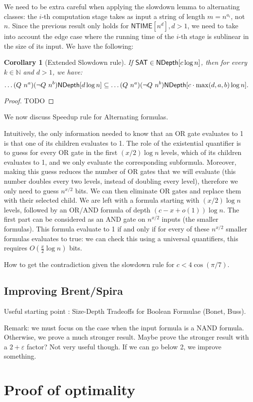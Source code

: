 \documentclass[a4paper, 11pt]{article}
\theoremstyle{plain}
\newtheorem{corollary}[theorem]{Corollary}
\theoremstyle{definition}
\theoremstyle{remark}
\newcommand{\NN}{\mathbb{N}}%
\newcommand{\eps}{\varepsilon}%
\newcommand{\NTIME}{\textsf{NTIME}}%
\newcommand{\SAT}{\textsf{SAT}}%
\newcommand{\NAND}{\textsf{NAND}}%
\newcommand{\ND}{\textsf{NDepth}}%
\newcommand{\NDL}[1]{\ensuremath\ND[ #1 \log n]}%
\begin{document}
We need to be extra careful when applying the slowdown lemma to alternating classes:
the $i$-th computation stage takes as input a string of length $m = n^{a_i}$, not $n$.
Since the previous result only holds for $\NTIME[n^d], d > 1$, 
we need to take into
account the edge case where the running time of the $i$-th
stage is sublinear in the size of its input.
We have the following:
\begin{corollary}[Extended Slowdown rule]
	If $\SAT{}\in \NDL{c}$, then for every $k \in\NN$ and $d > 1$, we have:
	\[\ldots (Q~n^{a}) (\neg Q~n^b) \NDL{d}
	\subseteq \ldots (Q~n^{a}) (\neg Q~n^b) \NDL{c\cdot\max(d, a, b)}.\]
\end{corollary}
\begin{proof}
	TODO
\end{proof}

We now discuss
Speedup rule for Alternating formulas.

Intuitively, the only information needed to know that an OR gate evaluates
to 1 is that one of its children evaluates to 1.
The role of the existential quantifier is to guess for every OR gate in the first $(x/2)\log n$ levels,
which of its children evaluates to 1, and we only evaluate the corresponding subformula.
Moreover, making this guess reduces the number of OR gates that we will evaluate
(this number doubles every two levels, instead of doubling every level), 
therefore we only need to guess $n^{x/2}$ bits. 
We can then eliminate OR gates and replace them with their selected child.
We are left with a formula starting with $(x/2)\log n$ levels, 
followed by an OR/AND formula of depth $(c-x + o(1)) \log n$.
The first part can be considered as an AND gate on $n^{x/2}$ inputs (the smaller formulas).
This formula evaluate to 1 if and only if for every of these $n^{x/2}$
smaller formulas evaluates to true: we can check this using a universal quantifiers, 
this requires $O(\frac{x}{2}\log n)$ bits.


How to get the contradiction given the slowdown rule for $c < 4\cos(\pi /7)$.

\subsection{Improving Brent/Spira}
Useful starting point : Size-Depth Tradeoffs for Boolean Formulae (Bonet, Buss).

Remark: we must focus on the case when the input formula is a \NAND{} formula.
Otherwise, we prove a much stronger result.
Maybe prove the stronger result with a $2+\eps$ factor? Not very useful though.
If we can go below 2, we improve something.
\section{Proof of optimality}




\end{document}
